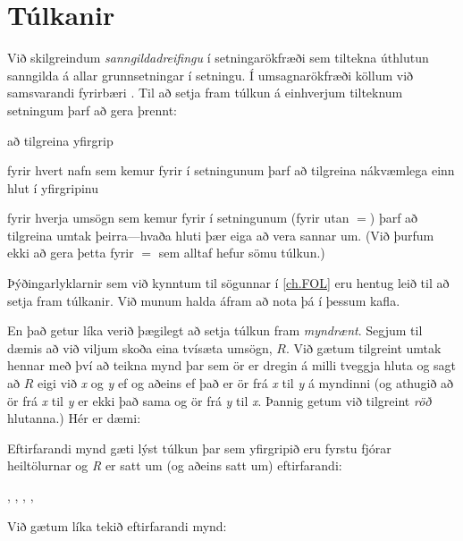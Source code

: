 \section{Túlkanir}
Við skilgreindum \emph{sanngildadreifingu} í setningarökfræði sem tiltekna úthlutun sanngilda á allar grunnsetningar í setningu. Í umsagnarökfræði köllum við samsvarandi fyrirbæri . Til að setja fram túlkun á einhverjum tilteknum setningum þarf að gera þrennt:
	\begin{ebullet}	
		\item að tilgreina yfirgrip
		\item fyrir hvert nafn sem kemur fyrir í setningunum þarf að tilgreina nákvæmlega einn hlut í yfirgripinu
		\item fyrir hverja umsögn sem kemur fyrir í setningunum (fyrir utan $=$) þarf að tilgreina umtak þeirra---hvaða hluti þær eiga að vera sannar um. (Við þurfum ekki að gera þetta fyrir $=$ sem alltaf hefur sömu túlkun.)
	\end{ebullet}
Þýðingarlyklarnir sem við kynntum til sögunnar í \ref{ch.FOL} eru hentug leið til að setja fram túlkanir. Við munum halda áfram að nota þá í þessum kafla.

En það getur líka verið þægilegt að setja túlkun fram \emph{myndrænt}. Segjum til dæmis að við viljum skoða eina tvísæta umsögn, $R$. Við gætum tilgreint umtak hennar með því að teikna mynd þar sem ör er dregin á milli tveggja hluta og sagt að $R$ eigi við \emph{x} og \emph{ y} ef og aðeins ef það er ör frá \emph{x} til \emph{y} á myndinni (og athugið að ör frá \emph{x} til \emph{y} er ekki það sama og ör frá \emph{y} til \emph{x}. Þannig getum við tilgreint \emph{röð} hlutanna.) Hér er dæmi:
\begin{center}
\end{center}
Eftirfarandi mynd gæti lýst túlkun þar sem yfirgripið eru fyrstu fjórar heiltölurnar og \emph{R} er satt um (og aðeins satt um) eftirfarandi:
	\begin{center}
		, 
		, 
		, 
		, 
	\end{center}
Við gætum líka tekið eftirfarandi mynd:

